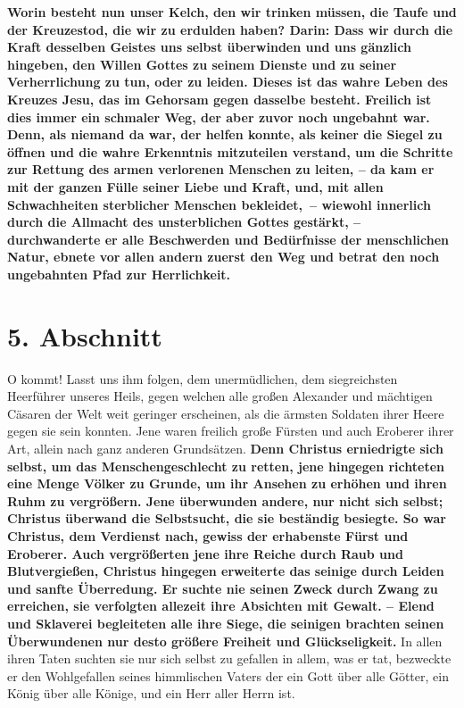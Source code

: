 \label{ref:04_04_kelch_taufe_kreuz}
\textbf{Worin besteht nun unser Kelch, den wir trinken müssen, die Taufe und
der
Kreuzestod, die wir zu erdulden haben? Darin: Dass wir durch die Kraft desselben
Geistes uns selbst überwinden und uns gänzlich hingeben, den Willen Gottes zu
seinem Dienste und zu seiner Verherrlichung zu tun, oder zu leiden. Dieses ist
das wahre Leben des Kreuzes Jesu, das im Gehorsam gegen dasselbe besteht.
Freilich ist dies immer ein schmaler Weg, der aber zuvor noch ungebahnt war.
Denn, als
niemand da war, der helfen konnte, als keiner die Siegel zu
öffnen und die wahre
Erkenntnis mitzuteilen verstand, um die Schritte zur Rettung des armen
verlorenen Menschen zu leiten, -- da kam er mit der ganzen Fülle seiner Liebe und
Kraft, und, mit allen Schwachheiten sterblicher Menschen bekleidet,~-- wiewohl
innerlich durch die Allmacht des unsterblichen
Gottes
gestärkt, -- durchwanderte
er alle Beschwerden und Bedürfnisse der menschlichen Natur,
ebnete vor allen
andern zuerst den Weg und
betrat den noch ungebahnten Pfad zur Herrlichkeit.}

\section{5. Abschnitt} \label{kap4_ab5}

\label{ref:04_05_besigen}
O kommt! Lasst uns ihm folgen, dem unermüdlichen, dem siegreichsten Heerführer
unseres Heils, gegen welchen alle großen Alexander
und mächtigen Cäsaren der Welt
weit geringer erscheinen, als die ärmsten Soldaten ihrer Heere
 gegen sie sein
konnten. Jene waren freilich große Fürsten und auch Eroberer
 ihrer Art, allein
nach ganz anderen Grundsätzen. \textbf{Denn Christus erniedrigte sich selbst, um
das
Menschengeschlecht zu retten, jene hingegen richteten eine Menge Völker zu
Grunde, um ihr Ansehen zu erhöhen und ihren Ruhm zu vergrößern. Jene überwunden
andere, nur nicht sich selbst; Christus überwand die Selbstsucht, die sie
beständig besiegte. So war Christus, dem Verdienst nach, gewiss der erhabenste
Fürst und Eroberer. Auch vergrößerten jene ihre Reiche durch Raub und
Blutvergießen, Christus hingegen erweiterte das seinige durch Leiden und sanfte
Überredung. Er suchte nie seinen Zweck durch Zwang zu erreichen, sie verfolgten
allezeit ihre Absichten mit Gewalt. -- Elend und Sklaverei begleiteten alle ihre
Siege, die seinigen brachten seinen Überwundenen nur desto größere Freiheit und
Glückseligkeit.} In allen ihren Taten suchten sie nur sich selbst zu gefallen
in allem, was er tat, bezweckte
er den Wohlgefallen seines himmlischen Vaters
der ein Gott über alle Götter, ein König über alle Könige, und ein Herr aller
Herrn ist.

